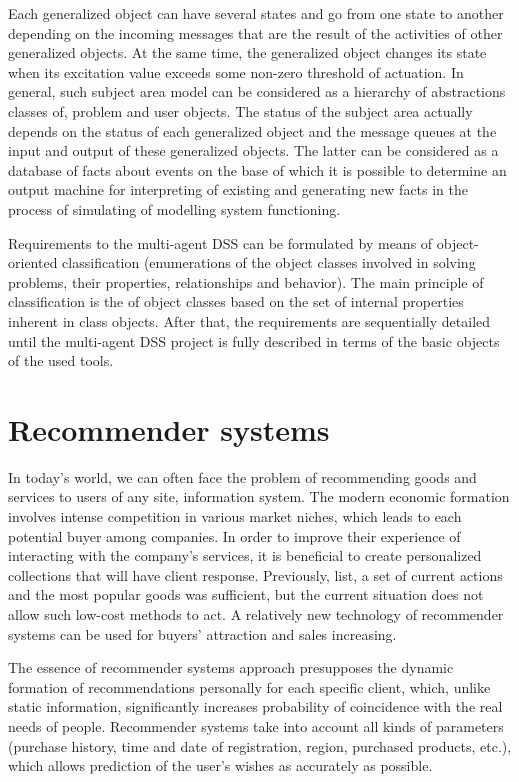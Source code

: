 \documentclass[10pt, a4paper]{article}
\begin{document}
\begin{multicols}{2}
Each generalized object can have several states and go
from one state to another depending on the incoming
messages that are the result of the activities of other
generalized objects. At the same time, the generalized
object changes its state when its excitation value exceeds
some non-zero threshold of actuation. In general, such
subject area model can be considered as a hierarchy of
abstractions classes of,
problem and user objects. The status of the subject area
actually depends on the status of each generalized object
and the message queues at the input and output of these
generalized objects. The latter can be considered as a
database of facts about events on the base of which it is
possible to determine an output machine for interpreting of existing and generating new facts in the process of
simulating of modelling system functioning.

Requirements to the multi-agent DSS can be formulated
by means of object-oriented classification (enumerations
of the object classes involved in solving problems, their
properties, relationships and behavior). The main principle
of classification is the of object classes based
on the set of internal properties inherent in class objects.
After that, the requirements are sequentially detailed until
the multi-agent DSS project is fully described in terms of
the basic objects of the used tools.

\section{Recommender systems}
In today’s world, we can often face the problem of
recommending goods and services to users of any site,
information system. The modern economic formation
involves intense competition in various market niches,
which leads to each potential buyer among
companies. In order to improve their experience of
interacting with the company’s services, it is beneficial
to create personalized collections that will have client
response. Previously, list, a
set of current actions and the most popular goods was
sufficient, but the current situation does not allow such
low-cost methods to act. A relatively new technology of
recommender systems can be used for buyers’ attraction
and sales increasing.

The essence of recommender systems approach
presupposes the dynamic formation of recommendations
personally for each specific client, which, unlike
static information, significantly increases probability of
coincidence with the real needs of people. Recommender
systems take into account all kinds of parameters (purchase
history, time and date of registration, region, purchased
products, etc.), which allows prediction of the user’s
wishes as accurately as possible.


\end{multicols}
\end{document}
